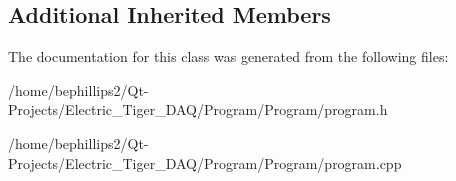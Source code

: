 \subsection*{Additional Inherited Members}


The documentation for this class was generated from the following files\+:\begin{DoxyCompactItemize}
\item 
/home/bephillips2/\+Qt-\/\+Projects/\+Electric\+\_\+\+Tiger\+\_\+\+D\+A\+Q/\+Program/\+Program/program.\+h\item 
/home/bephillips2/\+Qt-\/\+Projects/\+Electric\+\_\+\+Tiger\+\_\+\+D\+A\+Q/\+Program/\+Program/program.\+cpp\end{DoxyCompactItemize}
